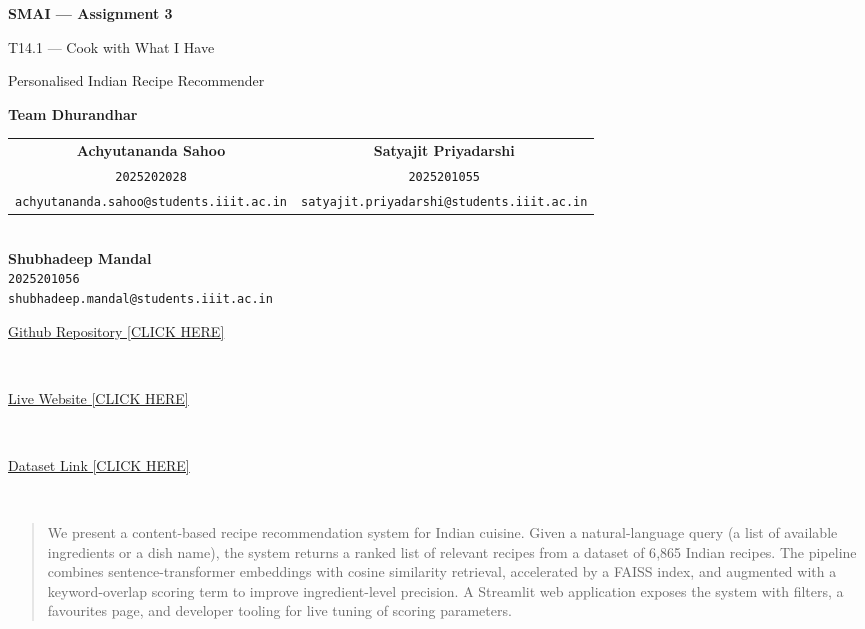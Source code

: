 \documentclass[12pt,a4paper]{article}
\begin{document}
\begin{titlepage}
  \centering
  \vspace*{2cm}
  {\LARGE\bfseries SMAI — Assignment 3\par}
  \vspace{0.5cm}
  {\Large\color{accent} T14.1 — Cook with What I Have\par}
  {\large Personalised Indian Recipe Recommender\par}
  \vspace{1cm}

  {\large\textbf{Team Dhurandhar}\par}
  \vspace{0.4cm}
  \begin{tabular}{cc}
    \textbf{Achyutananda Sahoo} & \textbf{Satyajit Priyadarshi} \\
    \texttt{2025202028} & \texttt{2025201055} \\
    \small \texttt{achyutananda.sahoo@students.iiit.ac.in} & \small \texttt{satyajit.priyadarshi@students.iiit.ac.in} \\
  \end{tabular}\\[0.6cm]
  \centering
  \textbf{Shubhadeep Mandal} \\
  \texttt{2025201056} \\
  \small \texttt{shubhadeep.mandal@students.iiit.ac.in} \\[0.8cm]

  \small
  {\normalsize\href{https://github.com/Seronic2001/Assignment-3/tree/recommendation-system}{Github Repository [CLICK HERE]}\par} \\ [0.4em]
  {\normalsize\href{https://smaia3-assignment-3-team-dhurandhar.streamlit.app/}{Live Website [CLICK HERE]}\par} \\ [0.4em]
  {\normalsize\href{https://github.com/kanishk307/IndianFoodDatasetGeneration}{Dataset Link [CLICK HERE]}\par} \\[5em]
  

  \begin{abstract}
    \normalsize
    We present a content-based recipe recommendation system for Indian cuisine.
    Given a natural-language query (a list of available ingredients or a dish name),
    the system returns a ranked list of relevant recipes from a dataset of 6{,}865
    Indian recipes. The pipeline combines sentence-transformer embeddings with
    cosine similarity retrieval, accelerated by a FAISS index, and augmented with
    a keyword-overlap scoring term to improve ingredient-level precision. A
    Streamlit web application exposes the system with filters, a favourites page,
    and developer tooling for live tuning of scoring parameters.
  \end{abstract}
\end{titlepage}
\end{document}
